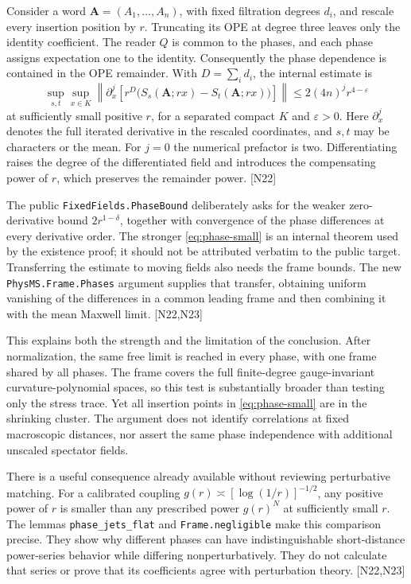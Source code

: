 \documentclass[11pt]{article}
\newcommand{\code}[1]{{\small\nolinkurl{#1}}}
\newcommand{\src}[1]{\textsf{[#1]}}
\begin{document}
Consider a word $\boldsymbol A=(A_1,\ldots,A_n)$, with fixed filtration
degrees $d_i$, and rescale every insertion position by $r$. Truncating its
OPE at degree three leaves only the identity coefficient. The reader $Q$
is common to the phases, and each phase assigns expectation one to the
identity. Consequently the phase dependence is contained in the OPE
remainder. With $D=\sum_i d_i$, the internal estimate is
\begin{equation}\label{eq:phase-small}
 \sup_{s,t}\sup_{x\in K}
 \left\|\partial_x^j\left[
 r^D\bigl(S_s(\boldsymbol A;rx)-S_t(\boldsymbol A;rx)\bigr)
 \right]\right\|
 \leq 2(4n)^j r^{4-\varepsilon}
\end{equation}
at sufficiently small positive $r$, for a separated compact $K$ and
$\varepsilon>0$. Here $\partial_x^j$ denotes the full iterated derivative
in the rescaled coordinates, and $s,t$ may be characters or the mean.
For $j=0$ the numerical prefactor is two. Differentiating raises the
degree of the differentiated field and introduces the compensating power
of $r$, which preserves the remainder power. \src{N22}

The public \code{FixedFields.PhaseBound} deliberately asks for the weaker
zero-derivative bound $2r^{1-\delta}$, together with convergence of the
phase differences at every derivative order. The stronger
\eqref{eq:phase-small} is an internal theorem used by the existence proof;
it should not be attributed verbatim to the public target. Transferring
the estimate to moving fields also needs the frame bounds. The new
\code{PhysMS.Frame.Phases} argument supplies that transfer, obtaining
uniform vanishing of the differences in a common leading frame and then
combining it with the mean Maxwell limit. \src{N22,N23}

This explains both the strength and the limitation of the conclusion.
After normalization, the same free limit is reached in every phase, with
one frame shared by all phases. The frame covers the full finite-degree
gauge-invariant curvature-polynomial spaces, so this test is substantially
broader than testing only the stress trace. Yet all insertion points in
\eqref{eq:phase-small} are in the shrinking cluster. The argument does not
identify correlations at fixed macroscopic distances, nor assert the same
phase independence with additional unscaled spectator fields.

There is a useful consequence already available without reviewing
perturbative matching. For a calibrated coupling
$g(r)\asymp[\log(1/r)]^{-1/2}$, any positive power of $r$ is smaller than
any prescribed power $g(r)^N$ at sufficiently small $r$. The lemmas
\code{phase_jets_flat} and \code{Frame.negligible} make this comparison
precise. They show why different phases can have indistinguishable
short-distance power-series behavior while differing nonperturbatively.
They do not calculate that series or prove that its coefficients agree
with perturbation theory. \src{N22,N23}
\end{document}
